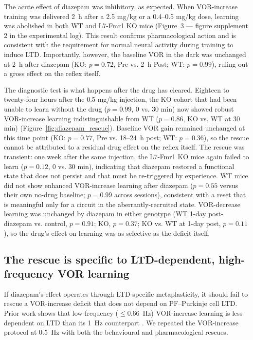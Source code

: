 \documentclass[11pt]{article}
\begin{document}
The acute effect of diazepam was inhibitory, as expected. When VOR-increase
training was delivered 2~h after a 2.5 mg/kg or a 0.4--0.5 mg/kg dose,
learning was abolished in both WT and L7-Fmr1 KO mice (Figure~3 --- figure
supplement 2 in the experimental log). This result confirms pharmacological
action and is consistent with the requirement for normal neural activity
during training to induce LTD. Importantly, however, the baseline VOR in
the dark was unchanged at 2~h after diazepam (KO: $p = 0.72$, Pre vs. 2~h
Post; WT: $p = 0.99$), ruling out a gross effect on the reflex itself.

The diagnostic test is what happens after the drug has cleared. Eighteen
to twenty-four hours after the 0.5 mg/kg injection, the KO cohort that
had been unable to learn without the drug ($p = 0.99$, 0 vs. 30 min)
now showed robust VOR-increase learning indistinguishable from WT
($p = 0.86$, KO vs. WT at 30 min) (Figure~\ref{fig:diazepam_rescue}).
Baseline VOR gain remained unchanged at this time point (KO: $p = 0.77$,
Pre vs. 18--24~h post; WT: $p = 0.36$), so the rescue cannot be attributed
to a residual drug effect on the reflex itself. The rescue was transient:
one week after the same injection, the L7-Fmr1 KO mice again failed to
learn ($p = 0.12$, 0 vs. 30 min), indicating that diazepam restored a
functional state that does not persist and that must be re-triggered by
experience. WT mice did not show enhanced VOR-increase learning after
diazepam ($p = 0.55$ versus their own no-drug baseline; $p = 0.99$ across
sessions), consistent with a reset that is meaningful only for a circuit
in the aberrantly-recruited state. VOR-decrease learning was unchanged
by diazepam in either genotype (WT 1-day post-diazepam vs. control,
$p = 0.91$; KO, $p = 0.37$; KO vs. WT at 1-day post, $p = 0.11$), so the
drug's effect on learning was as selective as the deficit itself.

\subsection{The rescue is specific to LTD-dependent, high-frequency VOR
learning}

If diazepam's effect operates through LTD-specific metaplasticity, it
should fail to rescue a VOR-increase deficit that does not depend on
PF--Purkinje cell LTD. Prior work shows that low-frequency ($\leq 0.66$~Hz)
VOR-increase learning is less dependent on LTD than its 1~Hz counterpart
\citep{boyden2004cerebellum}. We repeated the VOR-increase protocol at
0.5~Hz with both the behavioural and pharmacological rescues.
\end{document}
